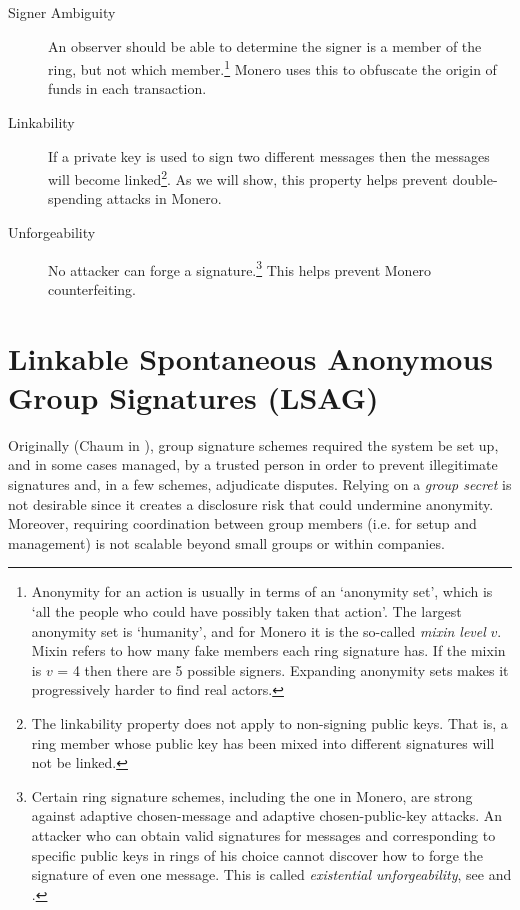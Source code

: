 \begin{description}
	
	\item[Signer Ambiguity]
	An observer should be able to determine the signer is a member of the ring, but not which member.\footnote{\label{anonymity_note}Anonymity for an action is usually in terms of an `anonymity set’, which is `all the people who could have possibly taken that action’. The largest anonymity set is `humanity’, and for Monero it is the so-called {\em mixin level} $v$. Mixin refers to how many fake members each ring signature has. If the mixin is $v$ = 4 then there are 5 possible signers. Expanding anonymity sets makes it progressively harder to find real actors.} Monero uses this to obfuscate the origin of funds in each transaction.
		
	\item[Linkability] 
	If a private key is used to sign two different messages then the messages will become linked\footnote{\label{linkability_note}The linkability property does not apply to non-signing public keys. That is, a ring member whose public key has been mixed into different signatures will not be linked.}. As we will show, this property helps prevent double-spending attacks in Monero.
	 
	\item[Unforgeability]
    No attacker can forge a signature.\footnote{\label{unforgeability_note}Certain ring signature schemes, including the one in Monero, are strong against adaptive chosen-message and adaptive chosen-public-key attacks. An attacker who can obtain valid signatures for messages and corresponding to specific public keys in rings of his choice cannot discover how to forge the signature of even one message. This is called {\em existential unforgeability}, see \cite{ledger34} and \cite{Liu2004}.} This helps prevent Monero counterfeiting. 
	
\end{description}




\section{Linkable Spontaneous Anonymous Group Signatures (LSAG)}
\label{LSAG_section}

Originally (Chaum in \cite{Chaum:1991:GS:1754868.1754897}), group signature schemes required the system be set up, and in some cases managed, by a trusted person in order to prevent illegitimate signatures and, in a few schemes, adjudicate disputes. Relying on a {\em group secret} is not desirable since it creates a disclosure risk that could undermine anonymity. Moreover, requiring coordination between group members (i.e. for setup and management) is not scalable beyond small groups or within companies.

